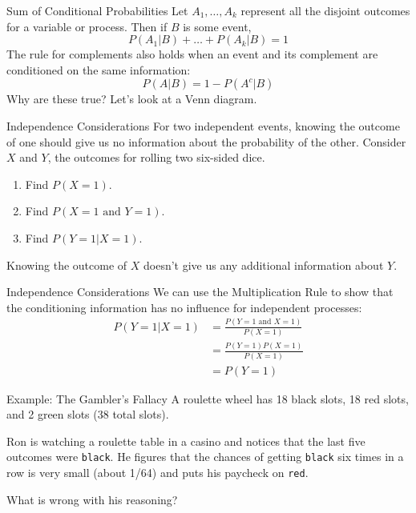 \begin{frame}{Sum of Conditional Probabilities}
    Let $A_1, \dots, A_k$ represent all the disjoint outcomes for a variable or process. Then if $B$ is some event,
    \[
        P(A_1|B) + \dots + P(A_k|B) = 1
    \]
    The rule for complements also holds when an event and its complement are conditioned on the same information:
    \[
    P(A|B) = 1 − P(A^c|B)
    \]
    Why are these true? Let's look at a Venn diagram.
\end{frame}

\begin{frame}{Independence Considerations}
    For two independent events, knowing the outcome of one should give us no information about the probability of the other. Consider $X$ and $Y$, the outcomes for rolling two six-sided dice.
    \begin{enumerate}
        \item Find $P(X=1)$.
        \item Find $P(X=1 \text{ and }Y=1)$.
        \item Find $P(Y=1|X=1)$.
    \end{enumerate}
    Knowing the outcome of $X$ doesn't give us any additional information about $Y$.
\end{frame}

\begin{frame}{Independence Considerations}
    We can use the Multiplication Rule to show that the conditioning information has no influence for independent processes:
    \begin{align*}
        P(Y=1|X=1) &= \frac{P(Y=1\text{ and }X=1)}{P(X=1)} \\
        &= \frac{P(Y=1)P(X=1)}{P(X=1)} \\
        &= P(Y=1)
    \end{align*}
\end{frame}

\begin{frame}{Example: The Gambler's Fallacy}
    A roulette wheel has 18 black slots, 18 red slots, and 2 green slots (38 total slots). 

    \vspace{12pt}Ron is watching a roulette table in a casino and notices that the last five outcomes were \texttt{black}. He figures that the chances of getting \texttt{black} six times in a row is very small (about 1/64) and puts his paycheck on \texttt{red}. 
    
    \vspace{12pt}What is wrong with his reasoning?
\end{frame}

